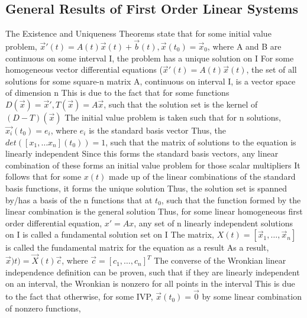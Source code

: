 \documentclass[11 pt, twoside]{article}
\newenvironment{outline*}
{
	\begin{outline}[enumerate]
	}
	{\end{outline}
}
\begin{document}
\subsection{General Results of First Order Linear Systems}
\begin{outline*}
\1 The Existence and Uniqueness Theorems state that for some initial value problem, $\vec{x}'(t) = A(t)\vec{x}(t) + \vec{b}(t), \vec{x}(t_0) = \vec{x}_0$, where A and B are continuous on some interval I, the problem has a unique solution on I
\1 For some homogeneous vector differential equations ($\vec{x}'(t) = A(t)\vec{x}(t)$, the set of all solutions for some square-n matrix A, continuous on interval I, is a vector space of dimension n
\2 This is due to the fact that for some functions $D(\vec{x}) = \vec{x}', T(\vec{x}) = A\vec{x}$, such that the solution set is the kernel of $(D - T)(\vec{x})$
\2 The initial value problem is taken such that for n solutions, $\vec{x_i}(t_0) = e_i$, where $e_i$ is the standard basis vector
\3 Thus, the $det([x_1, \dots x_n](t_0)) = 1$, such that the matrix of solutions to the equation is linearly independent
\3 Since this forms the standard basis vectors, any linear combination of these forms an initial value problem for those scalar multipliers
\2 It follows that for some $x(t)$ made up of the linear combinations of the standard basis functions, it forms the unique solution
\3 Thus, the solution set is spanned by/has a basis of the n functions that at $t_0$, such that the function formed by the linear combination is the general solution
\1 Thus, for some linear homogeneous first order differential equation, $x' = Ax$, any set of n linearly independent solutions on I is called a fundamental solution set on I
\2 The matrix, $X(t) = [\vec{x}_1, \dots, \vec{x}_n]$ is called the fundamental matrix for the equation as a result
\2 As a result, $\vec{x})t) = \vec{X}(t)\vec{c}$, where $\vec{c} = [c_1, \dots, c_n]^T$
\1 The converse of the Wronkian linear independence definition can be proven, such that if they are linearly independent on an interval, the Wronkian is nonzero for all points in the interval
\2 This is due to the fact that otherwise, for some IVP, $\vec{x}(t_0) = \vec{0}$ by some linear combination of nonzero functions, 
\end{outline*}
\end{document}
